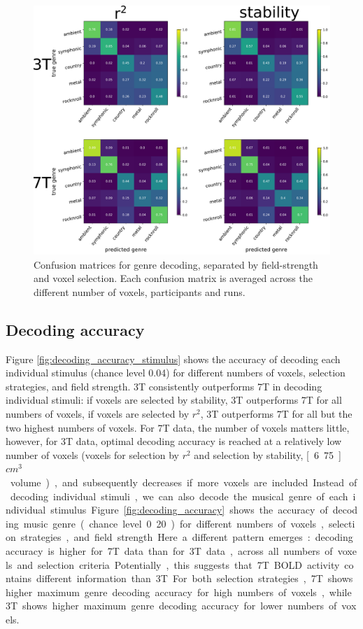 \begin{figure}
  \centering
  \includegraphics[width=\linewidth]{pics/conf_mats.pdf}

  \caption{ Confusion matrices for genre decoding, separated by field-strength and voxel selection. Each confusion matrix is averaged across the different number of voxels, participants and runs.}

 \label{fig:confusion_matrices}
\end{figure}

\subsection*{Decoding accuracy}

Figure \ref{fig:decoding_accuracy_stimulus} shows the accuracy of decoding each individual stimulus (chance level 0.04) for different numbers of voxels, selection strategies, and field strength. 3T consistently outperforms 7T in decoding individual stimuli: if voxels are selected by stability, 3T outperforms 7T for all numbers of voxels, if voxels are selected by $r^{2}$, 3T outperforms 7T for all but the two highest numbers of voxels. For 7T data, the number of voxels matters little, however, for 3T data, optimal decoding accuracy is reached at a relatively low number of voxels (\unit[250]{voxels} for selection by $r^{2}$ and selection by stability, \unit[6.75]{$cm^{3}$} volume), and subsequently decreases if more voxels are included.

Instead of decoding individual stimuli, we can also decode the musical genre of each individual stimulus. Figure \ref{fig:decoding_accuracy} shows the accuracy of decoding music genre (chance level 0.20) for different numbers of voxels, selection strategies, and field strength. Here a different pattern emerges: decoding accuracy is higher for 7T data than for 3T data, across all numbers of voxels and selection criteria. Potentially, this suggests that 7T BOLD activity contains different information than 3T.  For both selection strategies, 7T shows higher maximum genre decoding accuracy for high numbers of voxels, while 3T shows higher maximum genre decoding accuracy for lower numbers of voxels.

